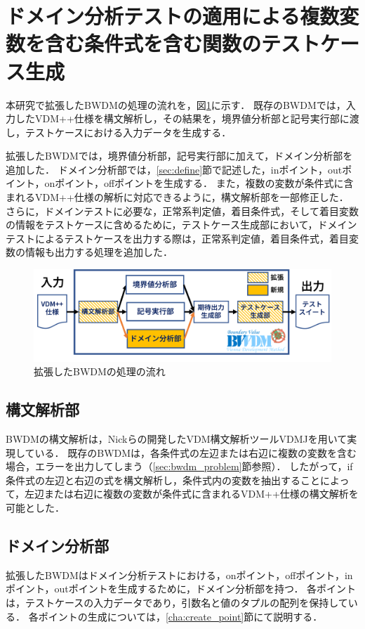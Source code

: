 \documentclass[uplatex, report, a4j, 10pt]{jsbook}
\begin{document}
\section{ドメイン分析テストの適用による複数変数を含む条件式を含む関数のテストケース生成}

本研究で拡張したBWDMの処理の流れを，図\ref{fig:bwdm_structure}に示す．
既存のBWDMでは，入力したVDM++仕様を構文解析し，その結果を，境界値分析部と記号実行部に渡し，テストケースにおける入力データを生成する．

拡張したBWDMでは，境界値分析部，記号実行部に加えて，ドメイン分析部を追加した．
ドメイン分析部では，\ref{sec:define}節で記述した，inポイント，outポイント，onポイント，offポイントを生成する．
また，複数の変数が条件式に含まれるVDM++仕様の解析に対応できるように，構文解析部を一部修正した．
さらに，ドメインテストに必要な，正常系判定値，着目条件式，そして着目変数の情報をテストケースに含めるために，テストケース生成部において，ドメインテストによるテストケースを出力する際は，正常系判定値，着目条件式，着目変数の情報も出力する処理を追加した．

\begin{figure}[t]
	\begin{center}
		\includegraphics[keepaspectratio, width=160mm]{figs/bwdm_structure.png}
		\caption{拡張したBWDMの処理の流れ}
		\label{fig:bwdm_structure}
	\end{center}
\end{figure}

\subsection{構文解析部}
BWDMの構文解析は，Nickらの開発したVDM構文解析ツールVDMJを用いて実現している\cite{vdmj}．
既存のBWDMは，各条件式の左辺または右辺に複数の変数を含む場合，エラーを出力してしまう（\ref{sec:bwdm_problem}節参照）．
したがって，if条件式の左辺と右辺の式を構文解析し，条件式内の変数を抽出することによって，左辺または右辺に複数の変数が条件式に含まれるVDM++仕様の構文解析を可能とした．

\subsection{ドメイン分析部}\label{cha:DomainAnalyzer}
拡張したBWDMはドメイン分析テストにおける，onポイント，offポイント，inポイント，outポイントを生成するために，ドメイン分析部を持つ．
各ポイントは，テストケースの入力データであり，引数名と値のタプルの配列を保持している．
各ポイントの生成については，\ref{cha:create_point}節にて説明する．
\end{document}
